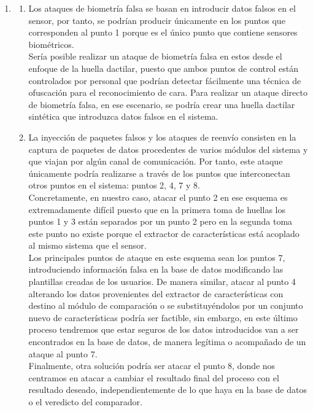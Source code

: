 \documentclass[10pt,a4paper]{article}
\begin{document}
\begin{enumerate}[label=\textbf{\alph*)}]
\item
\begin{enumerate}[label=\textbf{\arabic*.}]
\item Los ataques de biometría falsa se basan en introducir datos falsos en el sensor, por tanto, se podrían producir únicamente en los puntos que corresponden al punto 1 porque es el único punto que contiene sensores biométricos.\\
Sería posible realizar un ataque de biometría falsa en estos desde el enfoque de la huella dactilar, puesto que ambos puntos de control están controlados por personal que podrían detectar fácilmente una técnica de ofuscación para el reconocimiento de cara. Para realizar un ataque directo de biometría falsa, en ese escenario, se podría crear una huella dactilar sintética que introduzca datos falsos en el sistema.
\item La inyección de paquetes falsos y los ataques de reenvío consisten en la captura de paquetes de datos procedentes de varios módulos del sistema y que viajan por algún canal de comunicación. Por tanto, este ataque únicamente podría realizarse a través de los puntos que interconectan otros puntos en el sistema: puntos 2, 4, 7 y 8.\\
Concretamente, en nuestro caso, atacar el punto 2 en ese esquema es extremadamente difícil puesto que en la primera toma de huellas los puntos 1 y 3 están separados por un punto 2 pero en la segunda toma este punto no existe porque el extractor de características está acoplado al mismo sistema que el sensor.\\
Los principales puntos de ataque en este esquema sean los puntos 7, introduciendo información falsa en la base de datos modificando las plantillas creadas de los usuarios. De manera similar, atacar al punto 4 alterando los datos provenientes del extractor de características con destino al módulo de comparación o se substituyéndolos por un conjunto nuevo de características podría ser factible, sin embargo, en este último proceso tendremos que estar seguros de los datos introducidos van a ser encontrados en la base de datos, de manera legítima o acompañado de un ataque al punto 7.\\
Finalmente, otra solución podría ser atacar el punto 8, donde nos centramos en atacar a cambiar el resultado final del proceso con el resultado deseado, independientemente de lo que haya en la base de datos o el veredicto del comparador.

\end{enumerate}


\end{enumerate}
\end{document}
